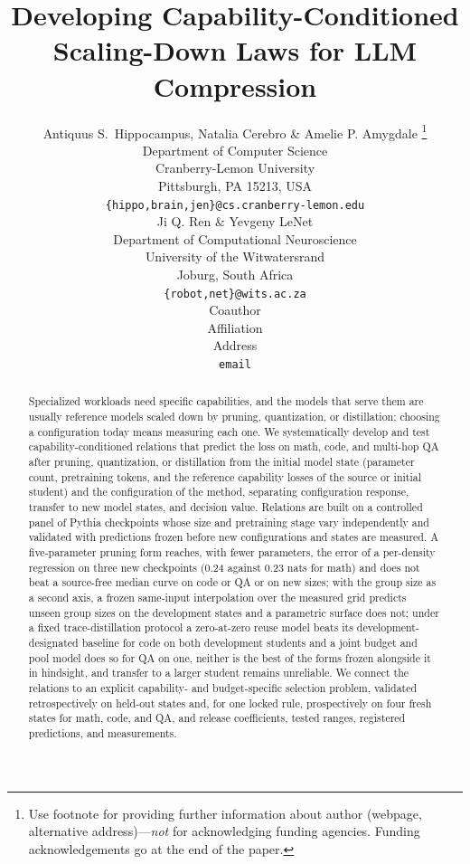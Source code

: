 \documentclass{article} %
\title{Developing Capability-Conditioned Scaling-Down Laws for LLM Compression}
\author{Antiquus S.~Hippocampus, Natalia Cerebro \& Amelie P. Amygdale \thanks{ Use footnote for providing further information
about author (webpage, alternative address)---\emph{not} for acknowledging
funding agencies.  Funding acknowledgements go at the end of the paper.} \\
Department of Computer Science\\
Cranberry-Lemon University\\
Pittsburgh, PA 15213, USA \\
\texttt{\{hippo,brain,jen\}@cs.cranberry-lemon.edu} \\
\And
Ji Q. Ren \& Yevgeny LeNet \\
Department of Computational Neuroscience \\
University of the Witwatersrand \\
Joburg, South Africa \\
\texttt{\{robot,net\}@wits.ac.za} \\
\AND
Coauthor \\
Affiliation \\
Address \\
\texttt{email}
}
\begin{document}
\maketitle

\begin{abstract}
Specialized workloads need specific capabilities, and the models that serve them are usually reference models scaled
down by pruning, quantization, or distillation; choosing a configuration today means
measuring each one. We systematically develop and test capability-conditioned relations
that predict the loss on math, code, and multi-hop QA after pruning,
quantization, or distillation from the initial model state (parameter
count, pretraining tokens, and the reference capability losses of the
source or initial student) and the configuration of the method,
separating configuration response, transfer to new model states, and
decision value. Relations are built on a controlled panel of Pythia checkpoints whose
size and pretraining stage vary independently and validated with
predictions frozen before new configurations and states are measured.
A five-parameter pruning form reaches, with fewer parameters, the
error of a per-density regression on three new checkpoints (0.24
against 0.23 nats for math) and does not beat a source-free median
curve on code or QA or on new sizes; with the group size as a second
axis, a frozen same-input interpolation over the measured grid predicts
unseen group sizes on the development states and a parametric surface
does not; under a fixed trace-distillation protocol a zero-at-zero reuse model beats its development-designated baseline for code on both development students and a joint budget and pool model does so for QA on one, neither is the best of the forms frozen alongside it in hindsight, and transfer to a larger student remains unreliable. We connect the relations to an explicit capability- and
budget-specific selection problem, validated retrospectively on
held-out states and, for one locked rule, prospectively on four fresh
states for math, code, and QA, and release coefficients, tested ranges,
registered predictions, and measurements.
\end{abstract}













\appendix

\end{document}
